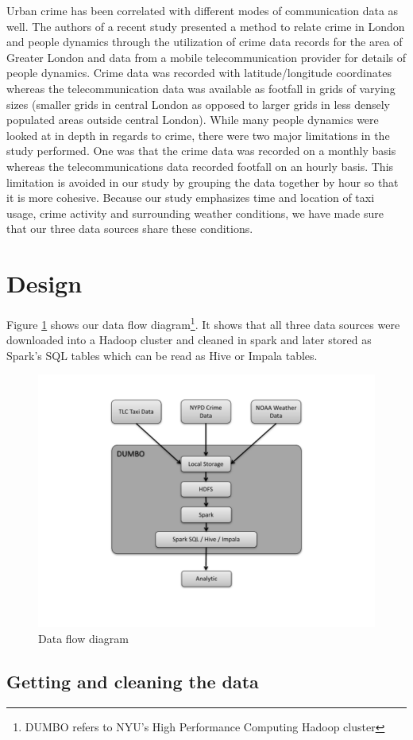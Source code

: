 \documentclass{sigkddExp}
\begin{document}
Urban crime has been correlated with different modes of communication data as well. The authors of a recent study \cite{Traunmueller14} presented a method to relate crime in London and people dynamics through the utilization of crime data records for the area of Greater London and data from a mobile telecommunication provider for details of people dynamics. Crime data was recorded with latitude/longitude coordinates whereas the telecommunication data was available as footfall in grids of varying sizes (smaller grids in central London as opposed to larger grids in less densely populated areas outside central London). While many people dynamics were looked at in depth in regards to crime, there were two major limitations in the study performed. One was that the crime data was recorded on a monthly basis whereas the telecommunications data recorded footfall on an hourly basis. This limitation is avoided in our study by grouping the data together by hour so that it is more cohesive. Because our study emphasizes time and location of taxi usage, crime activity and surrounding weather conditions, we have made sure that our three data sources share these conditions.


\section{Design}

Figure \ref{figx} shows our data flow diagram\footnote{DUMBO refers to NYU's High Performance Computing Hadoop cluster}.  It shows that all three data sources were downloaded into a Hadoop cluster and cleaned in spark and later stored as Spark's SQL tables which can be read as Hive or Impala tables.

\begin{figure}
\caption{Data flow diagram}
\label{figx}
\centering \includegraphics[width=.45\textwidth]{images/DesignFlowDiagram.pdf}
\end{figure}


\subsection{Getting and cleaning the data}
\end{document}
